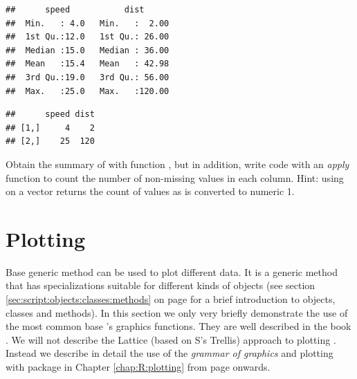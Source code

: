 \documentclass[krantz2]{krantz}\usepackage{knitr}%
\begin{document}
\begin{knitrout}\footnotesize
{}\color{fgcolor}\begin{kframe}
\begin{alltt}
\end{alltt}
\begin{verbatim}
##      speed           dist       
##  Min.   : 4.0   Min.   :  2.00  
##  1st Qu.:12.0   1st Qu.: 26.00  
##  Median :15.0   Median : 36.00  
##  Mean   :15.4   Mean   : 42.98  
##  3rd Qu.:19.0   3rd Qu.: 56.00  
##  Max.   :25.0   Max.   :120.00
\end{verbatim}
\begin{alltt}
\end{alltt}
\begin{verbatim}
##      speed dist
## [1,]     4    2
## [2,]    25  120
\end{verbatim}
\end{kframe}
\end{knitrout}

\begin{playground}
Obtain the summary of  with function , but in addition, write code with an \emph{apply} function to count the number of non-missing values in each column. Hint: using  on a  vector returns the count of  values as  is converted to numeric 1.
\end{playground}

\section{Plotting}
Base \Rlang generic method  can be used to plot different data. It is a generic method that has specializations suitable for different kinds of objects (see section \ref{sec:script:objects:classes:methods} on page \pageref{sec:script:objects:classes:methods} for a brief introduction to objects, classes and methods). In this section we only very briefly demonstrate the use of the most common base 's graphics functions. They are well described in the book  \autocite{Murrell2011}. We will not describe the Lattice (based on S's Trellis) approach to plotting \autocite{Sarkar2008}. Instead we describe in detail the use of the \emph{grammar of graphics} and plotting with package \ggplot in Chapter \ref{chap:R:plotting} from page \pageref{chap:R:plotting} onwards.
\end{document}
